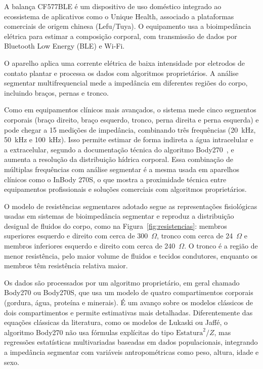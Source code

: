 A balança CF577BLE é um dispositivo de uso doméstico integrado ao ecossistema de
aplicativos como o Unique Health, associado a plataformas comerciais de origem chinesa
(Lefu/Tuya). O equipamento usa a bioimpedância elétrica para estimar a composição
corporal, com transmissão de dados por Bluetooth Low Energy (BLE) e Wi-Fi.

O aparelho aplica uma corrente elétrica de baixa intensidade por eletrodos de contato
plantar e processa os dados com algoritmos proprietários. A análise segmentar
multifrequencial mede a impedância em diferentes regiões do corpo, incluindo braços,
pernas e tronco.

Como em equipamentos clínicos mais avançados, o sistema mede cinco segmentos corporais
(braço direito, braço esquerdo, tronco, perna direita e perna esquerda) e pode chegar a
15 medições de impedância, combinando três frequências (20~kHz, 50~kHz e 100~kHz). Isso
permite estimar de forma indireta a água intracelular e a extracelular, segundo a
documentação técnica do algoritmo Body270~\cite{besthealth2023}, e aumenta a resolução
da distribuição hídrica corporal. Essa combinação de múltiplas frequências com análise
segmentar é a mesma usada em aparelhos clínicos como o InBody 270S, o que mostra a
proximidade técnica entre equipamentos profissionais e soluções comerciais com
algoritmos proprietários.

O modelo de resistências segmentares adotado segue as representações fisiológicas usadas
em sistemas de bioimpedância segmentar e reproduz a distribuição desigual de fluidos do
corpo, como na Figura~\ref{fig:resistencias}: membros superiores esquerdo e direito com
cerca de 300~$\Omega$, tronco com cerca de 24~$\Omega$ e membros inferiores esquerdo e
direito com cerca de 240~$\Omega$. O tronco é a região de menor resistência, pelo maior
volume de fluidos e tecidos condutores, enquanto os membros têm resistência relativa
maior.


Os dados são processados por um algoritmo proprietário, em geral chamado Body270 ou
Body270S, que usa um modelo de quatro compartimentos corporais (gordura, água, proteína
e minerais). É um avanço sobre os modelos clássicos de dois compartimentos e permite
estimativas mais detalhadas. Diferentemente das equações clássicas da literatura, como
os modelos de Lukaski ou Jaffé, o algoritmo Body270 não usa fórmulas explícitas do tipo
$\mathrm{Estatura}^2/Z$, mas regressões estatísticas multivariadas baseadas em dados
populacionais, integrando a impedância segmentar com variáveis antropométricas como
peso, altura, idade e sexo.

